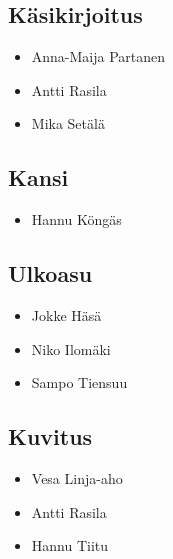 \subsection*{Käsikirjoitus}
\begin{itemize}
\item Anna-Maija Partanen
\item Antti Rasila
\item Mika Setälä
\end{itemize}

\subsection*{Kansi}
\begin{itemize}
\item Hannu Köngäs
\end{itemize}

\subsection*{Ulkoasu}
\begin{itemize}
\item Jokke Häsä
\item Niko Ilomäki
\item Sampo Tiensuu
\end{itemize}

\subsection*{Kuvitus}
\begin{itemize}
\item Vesa Linja-aho
\item Antti Rasila
\item Hannu Tiitu
\end{itemize}

